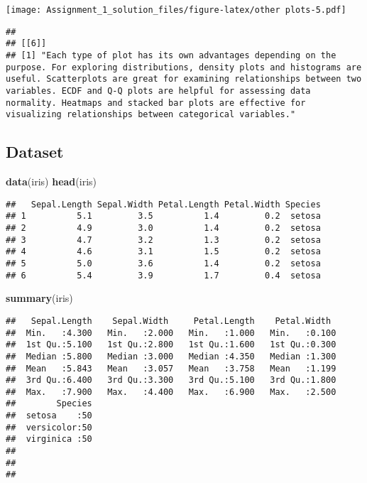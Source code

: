 \documentclass[
]{article}
\newenvironment{Shaded}{\begin{snugshade}}{\end{snugshade}}
\newcommand{\FunctionTok}[1]{\textcolor[rgb]{0.13,0.29,0.53}{\textbf{#1}}}
\newcommand{\NormalTok}[1]{#1}
\begin{document}
\texttt{[image: Assignment\_1\_solution\_files/figure-latex/other plots-5.pdf]}

\begin{verbatim}
## 
## [[6]]
## [1] "Each type of plot has its own advantages depending on the purpose. For exploring distributions, density plots and histograms are useful. Scatterplots are great for examining relationships between two variables. ECDF and Q-Q plots are helpful for assessing data normality. Heatmaps and stacked bar plots are effective for visualizing relationships between categorical variables."
\end{verbatim}

\hypertarget{dataset}{%
\subsection{Dataset}\label{dataset}}

\begin{Shaded}
\begin{Highlighting}[]
\FunctionTok{data}\NormalTok{(iris)}
\FunctionTok{head}\NormalTok{(iris)}
\end{Highlighting}
\end{Shaded}

\begin{verbatim}
##   Sepal.Length Sepal.Width Petal.Length Petal.Width Species
## 1          5.1         3.5          1.4         0.2  setosa
## 2          4.9         3.0          1.4         0.2  setosa
## 3          4.7         3.2          1.3         0.2  setosa
## 4          4.6         3.1          1.5         0.2  setosa
## 5          5.0         3.6          1.4         0.2  setosa
## 6          5.4         3.9          1.7         0.4  setosa
\end{verbatim}

\begin{Shaded}
\begin{Highlighting}[]
\FunctionTok{summary}\NormalTok{(iris)}
\end{Highlighting}
\end{Shaded}

\begin{verbatim}
##   Sepal.Length    Sepal.Width     Petal.Length    Petal.Width   
##  Min.   :4.300   Min.   :2.000   Min.   :1.000   Min.   :0.100  
##  1st Qu.:5.100   1st Qu.:2.800   1st Qu.:1.600   1st Qu.:0.300  
##  Median :5.800   Median :3.000   Median :4.350   Median :1.300  
##  Mean   :5.843   Mean   :3.057   Mean   :3.758   Mean   :1.199  
##  3rd Qu.:6.400   3rd Qu.:3.300   3rd Qu.:5.100   3rd Qu.:1.800  
##  Max.   :7.900   Max.   :4.400   Max.   :6.900   Max.   :2.500  
##        Species  
##  setosa    :50  
##  versicolor:50  
##  virginica :50  
##                 
##                 
## 
\end{verbatim}
\end{document}
